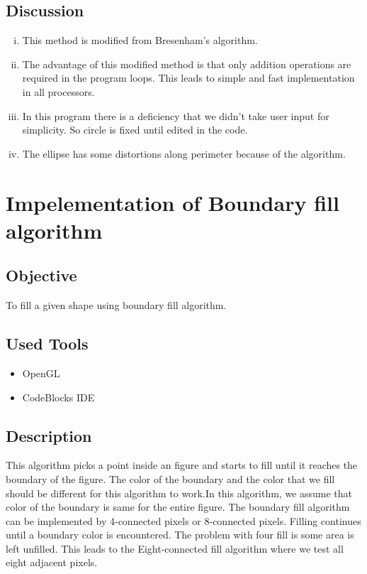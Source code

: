 \documentclass[11pt]{report}
\begin{document}
\section{Discussion}
\begin{enumerate}[(i)]
	\item This method is modified from Bresenham’s algorithm.
	\item The advantage of this modified method is that only addition operations are required in the program loops. This leads to simple and fast implementation in all processors.
	\item In this program there is a deficiency that we didn't take user input for simplicity. So circle is fixed until edited in the code.
	\item The ellipse has some  distortions along perimeter because of the algorithm.
\end{enumerate}




\chapter{Impelementation of Boundary fill algorithm}
\section{Objective}
To fill a given shape using boundary fill algorithm.
\section{Used Tools}
\begin{itemize}
	\item OpenGL
	\item CodeBlocks IDE
\end{itemize}

\section{Description}
This algorithm picks a point inside an figure and starts to fill until it reaches the boundary of the figure. The color of the boundary and the color that we fill should be different for this algorithm to work.In this algorithm, we assume that color of the boundary is same for the entire figure. The boundary fill algorithm can be implemented by 4-connected pixels or 8-connected pixels. Filling continues until a boundary color is encountered. The problem with four fill is some area is left unfilled. This leads to the  Eight-connected fill algorithm where we test all eight adjacent pixels.
\end{document}
